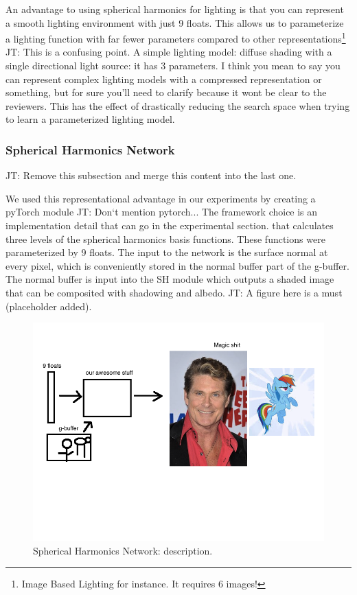 \documentclass[10pt,twocolumn,letterpaper]{article}
\newcommand{\tompson}[1]{{\color{green} JT: #1}}
\begin{document}
An advantage to using spherical harmonics for lighting is that you can represent a smooth lighting environment with just 9 floats. This allows us to parameterize a lighting function with far fewer parameters compared to other representations\footnote{Image Based Lighting for instance. It requires 6 images!} \tompson{This is a confusing point. A simple lighting model: diffuse shading with a single directional light source: it has 3 parameters. I think you mean to say you can represent complex lighting models with a compressed representation or something, but for sure you'll need to clarify because it wont be clear to the reviewers}. This has the effect of drastically reducing the search space when trying to learn a parameterized lighting model.

\subsubsection{Spherical Harmonics Network}

\tompson{Remove this subsection and merge this content into the last one.}

We used this representational advantage in our experiments by creating a pyTorch \cite{PYTORCH} module \tompson{Don`t mention pytorch... The framework choice is an implementation detail that can go in the experimental section.} that calculates three levels of the spherical harmonics basis functions.  These functions were parameterized by 9 floats.  The input to the network is the surface normal at every pixel, which is conveniently stored in the normal buffer part of the g-buffer. The normal buffer is input into the SH module which outputs a shaded image that can be composited with shadowing and albedo. \tompson{A figure here is a must (placeholder added).}
\begin{figure}[h!]
\centering
\includegraphics[width=1.0\columnwidth]{./assets/super_important_fig.png}
\caption{Spherical Harmonics Network: description.}
\label{fig:SHN}
\end{figure}
\end{document}
